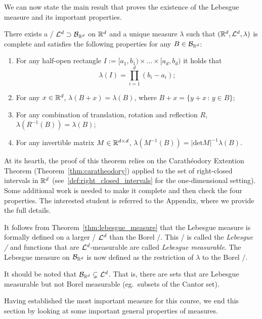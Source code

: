 We can now state the main result that proves the existence of the Lebesgue measure and its important properties. 

\begin{theorem}\label{thm:lebesgue_measure}
There exists a \sigalg/ $\mathcal L^d \supset \mathcal B_{\mathbb R^d}$ on $\mathbb R^d$ and a unique measure $\lambda$ such that $(\mathbb R^d, \mathcal L^d, \lambda)$ is complete and satisfies the following properties for any $B \in \mathcal B_{\mathbb R^d}$:
\begin{enumerate}
\item For any half-open rectangle $I := [a_1, b_1) \times \dots \times [a_d, b_d)$ it holds that 
	\[
		\lambda(I) = \prod_{i = 1}^d (b_i-a_i);
	\]
\item For any $x \in \mathbb R^d$, $\lambda(B+x) = \lambda(B)$, where $B + x = \{y+x \, : \, y \in B\}$;
\item For any combination of translation, rotation and reflection $R$, $\lambda(R^{-1}(B)) = \lambda(B)$;
\item For any invertible matrix $M \in \mathbb R^{d \times d}$, $\lambda(M^{-1}(B)) = |\mathrm{det} M|^{-1} \lambda(B)$.
\end{enumerate}
\end{theorem}

At its hearth, the proof of this theorem relies on the Carath\'{e}odory Extention Theorem (Theorem~\ref{thm:caratheodory}) applied to the set of right-closed intervals in $\mathbb R^d$ (see~\eqref{def:right_closed_intervals} for the one-dimensional setting). Some additional work is needed to make it complete and then check the four properties. The interested student is referred to the Appendix, where we provide the full details.  

It follows from Theorem~\ref{thm:lebesgue_measure} that the Lebesgue measure is formally defined on a larger \sigalg/ $\mathcal L^d$ than the Borel \sigalg/. This \sigalg/ is called the \emph{Lebesgue \sigalg/} and functions that are $\mathcal L^d$-measurable are called \emph{Lebesgue measurable}. The Lebesgue measure on $\mathcal B_{\mathbb R^d}$ is now defined as the restriction of $\lambda$ to the Borel \sigalg/. 

\begin{remark}
It should be noted that $\mathcal B_{\mathbb R^d} \subsetneq \mathcal L^d$. That is, there are sets that are Lebesgue measurable but not Borel measurable (eg.\ subsets of the Cantor set).
\end{remark}

Having established the most important measure for this course, we end this section by looking at some important general properties of measures.

